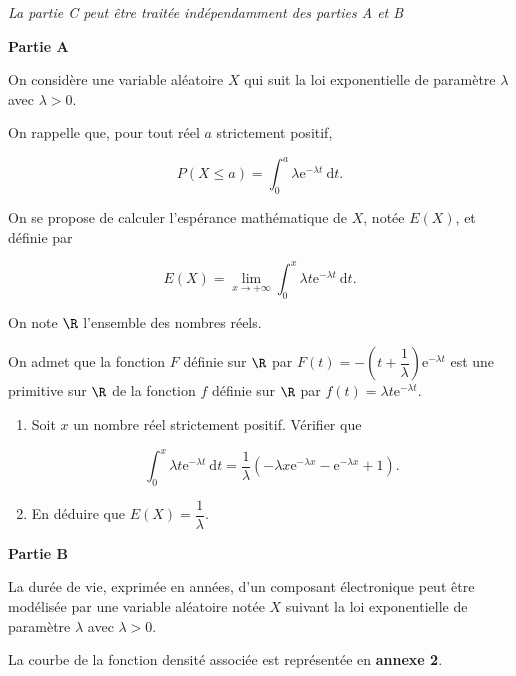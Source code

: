\documentclass[12pt,french]{article}
\begin{document}
\begin{question}[subtitle={Antilles Guyane 2015}]
\emph{La partie C peut être traitée indépendamment des parties A et B}

\bigskip

\textbf{Partie A}

\medskip

On considère une variable aléatoire $X$ qui suit la loi exponentielle de paramètre $\lambda$ avec $\lambda > 0$.

On rappelle que, pour tout réel $a$ strictement positif,

\[P(X \leqslant  a) = \displaystyle\int_0^a \lambda\text{e}^{- \lambda t}\:\text{d}t.\]

On se propose de calculer l'espérance mathématique de $X$, notée $E(X)$, et définie par

\[E(X) = \displaystyle\lim_{x \to + \infty} \int_0^x \lambda t \text{e}^{- \lambda t}\:\text{d}t.\]

On note $\R$ l'ensemble des nombres réels.

On admet que la fonction $F$ définie sur $\R$ par $F(t) = - \left(t + \dfrac{1}{\lambda}\right)\text{e}^{- \lambda t}$ est une primitive sur $\R$ de la fonction $f$ définie sur $\R$ par $f(t) = \lambda t \text{e}^{- \lambda t}$.

\medskip

\begin{enumerate}
\item Soit $x$ un nombre réel strictement positif. Vérifier que

\[\displaystyle \int_0^x \lambda t \text{e}^{- \lambda t}\:\text{d}t = \dfrac{1}{\lambda}\left(- \lambda x \text{e}^{- \lambda x} -  \text{e}^{- \lambda x} + 1\right).\]

\item  En déduire que $E(X) = \dfrac{1}{\lambda}$.
\end{enumerate}

\bigskip

\textbf{Partie B}

\medskip

La durée de vie, exprimée en années, d'un composant électronique peut être modélisée par une
variable aléatoire notée $X$ suivant la loi exponentielle de paramètre $\lambda$ avec $\lambda > 0$.

La courbe de la fonction densité associée est représentée en \textbf{annexe 2}.

\medskip


\end{question}
\end{document}
